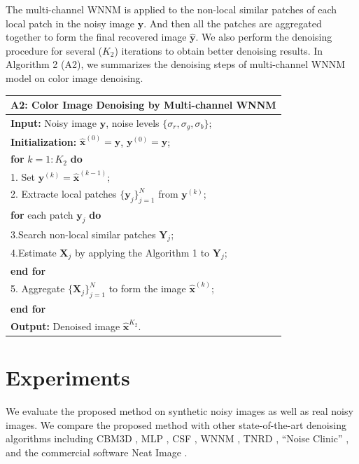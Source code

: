\documentclass[10pt,twocolumn,letterpaper]{article}
\begin{document}
The multi-channel WNNM is applied to the non-local similar patches of each local patch in the noisy image $\mathbf{y}$. And then all the patches are aggregated together to form the final recovered image $\hat{\mathbf{y}}$. We also perform the denoising procedure for several ($K_{2}$) iterations to obtain better denoising results. In Algorithm 2 (A2), we summarizes the denoising steps of multi-channel WNNM model on color image denoising.
\begin{table}\label{alg1}
\begin{tabular}{l}
\hline
\textbf{A2}: Color Image Denoising by Multi-channel WNNM
\\
\hline
\textbf{Input:} Noisy image $\mathbf{y}$, noise levels $\{\sigma_{r}, \sigma_{g}, \sigma_{b}\}$;
\\
\textbf{Initialization:} $\hat{\mathbf{x}}^{(0)}=\mathbf{y}$, $\mathbf{y}^{(0)}=\mathbf{y}$;
\\
\textbf{for} $k = 1:K_{2}$ \textbf{do}
\\
1. Set $\mathbf{y}^{(k)}=\hat{\mathbf{x}}^{(k-1)}$;
\\
2. Extracte local patches $\{\mathbf{y}_{j}\}_{j=1}^{N}$ from $\mathbf{y}^{(k)}$;
\\
\quad\textbf{for} each patch $\mathbf{y}_{j}$ \textbf{do}
\\
3.\quad Search non-local similar patches $\mathbf{Y}_{j}$;
\\
4.\quad Estimate $\mathbf{X}_{j}$ by applying the Algorithm 1 to $\mathbf{Y}_{j}$;
\\
\quad\textbf{end for}
\\
5. Aggregate $\{\mathbf{X}_{j}\}_{j=1}^{N}$ to form the image $\hat{\mathbf{x}}^{(k)}$;
\\
\textbf{end for}
\\
\textbf{Output:} Denoised image $\hat{\mathbf{x}}^{K_{2}}$.
\\
\hline
\end{tabular}
\end{table}

\section{Experiments}
We evaluate the proposed method on synthetic noisy images as well as real noisy images. We compare the proposed method with other state-of-the-art denoising algorithms including CBM3D \cite{bm3d,cbm3d}, MLP \cite{mlp}, CSF \cite{csf}, WNNM \cite{wnnm}, TNRD \cite{chen2015learning}, ``Noise Clinic'' \cite{noiseclinic,ncwebsite}, and the commercial software Neat Image \cite{neatimage}.
\end{document}
